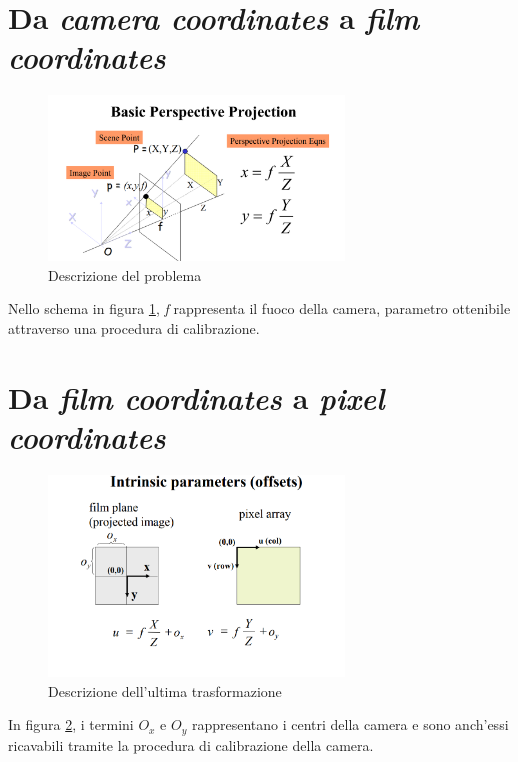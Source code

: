 \section{Da \textit{camera coordinates} a \textit{film coordinates}}
\begin{figure}[H]
	\centering
	\includegraphics[width=0.7\textwidth]{Immagini/perspective_projection.png}
	\caption{Descrizione del problema}
	\label{fig:perspective_projection}
\end{figure}
Nello schema in figura \ref{fig:perspective_projection}, \textit{f} rappresenta il fuoco della camera, parametro ottenibile attraverso una procedura di calibrazione.

\section{Da \textit{film coordinates} a \textit{pixel coordinates}}

\begin{figure}[H]
	\centering
	\includegraphics[width=0.7\textwidth]{Immagini/intrinsic_parameters.png}
	\caption{Descrizione dell'ultima trasformazione}
	\label{fig:intrinsic_parameters}
\end{figure}
In figura \ref{fig:intrinsic_parameters}, i termini $ O_{x}$ e $ O_{y} $ rappresentano i centri della camera e sono anch'essi ricavabili tramite la procedura di calibrazione della camera.

